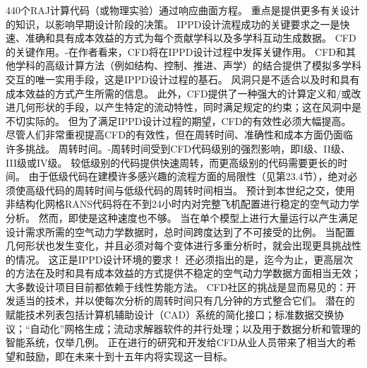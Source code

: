 \documentclass[UTF8,11pt,a4paper,openany,fontset=fandol]{ctexbook}
\begin{document}
440个RAJ计算代码（或物理实验）通过响应曲面方程。 重点是提供更多有关设计的知识，以影响早期设计阶段的决策。 IPPD设计流程成功的关键要求之一是快速、准确和具有成本效益的方式为每个贡献学科以及多学科互动生成数据。 CFD的关键作用。-在作者看来，CFD将在IPPD设计过程中发挥关键作用。 CFD和其他学科的高级计算方法（例如结构、控制、推进、声学）的结合提供了模拟多学科交互的唯一实用手段，这是IPPD设计过程的基石。 风洞只是不适合以及时和具有成本效益的方式产生所需的信息。 此外，CFD提供了一种强大的计算定义和/或改进几何形状的手段，以产生特定的流动特性，同时满足规定的约束；这在风洞中是不切实际的。 但为了满足IPPD设计过程的期望，CFD的有效性必须大幅提高。 尽管人们非常重视提高CFD的有效性，但在周转时间、准确性和成本方面仍面临许多挑战。 周转时间。-周转时间受到CFD代码级别的强烈影响，即I级、II级、III级或IV级。 较低级别的代码提供快速周转，而更高级别的代码需要更长的时间。 由于低级代码在建模许多感兴趣的流程方面的局限性（见第23.4节），绝对必须使高级代码的周转时间与低级代码的周转时间相当。 预计到本世纪之交，使用非结构化网格RANS代码将在不到24小时内对完整飞机配置进行稳定的空气动力学分析。 然而，即使是这种速度也不够。 当在单个模型上进行大量运行以产生满足设计需求所需的空气动力学数据时，总时间跨度达到了不可接受的比例。 当配置几何形状也发生变化，并且必须对每个变体进行多重分析时，就会出现更具挑战性的情况。 这正是IPPD设计环境的要求！ 还必须指出的是，迄今为止，更高层次的方法在及时和具有成本效益的方式提供不稳定的空气动力学数据方面相当无效；大多数设计项目目前都依赖于线性势能方法。 CFD社区的挑战是显而易见的：开发适当的技术，并以使每次分析的周转时间只有几分钟的方式整合它们。 潜在的赋能技术列表包括计算机辅助设计（CAD）系统的简化接口；标准数据交换协议；“自动化”网格生成；流动求解器软件的并行处理；以及用于数据分析和管理的智能系统，仅举几例。 正在进行的研究和开发给CFD从业人员带来了相当大的希望和鼓励，即在未来十到十五年内将实现这一目标。
\end{document}
